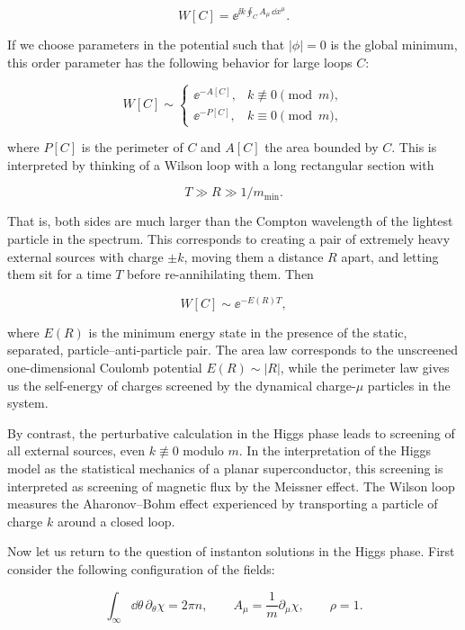 \[
  W[C]=\ee^{\ii k\oint_C A_\mu\,\dd x^\mu}.
\]

If we choose parameters in the potential such that $|\phi|=0$ is the global
minimum, this order parameter has the following behavior for large loops $C$:

\[
  W[C]\sim
  \begin{cases}
    \ee^{-A[C]},& k\not\equiv0\pmod m,\\
    \ee^{-P[C]},& k\equiv0\pmod m,
  \end{cases}
\]

where $P[C]$ is the perimeter of $C$ and $A[C]$ the area bounded by $C$. This
is interpreted by thinking of a Wilson loop with a long rectangular section with

\[
  T\gg R\gg1/m_{\min}.
\]

That is, both sides are much larger than the Compton wavelength of the lightest
particle in the spectrum. This corresponds to creating a pair of extremely heavy
external sources with charge $\pm k$, moving them a distance $R$ apart, and
letting them sit for a time $T$ before re-annihilating them. Then

\[
  W[C]\sim\ee^{-E(R)T},
\]

where $E(R)$ is the minimum energy state in the presence of the static,
separated, particle--anti-particle pair. The area law corresponds to the
unscreened one-dimensional Coulomb potential $E(R)\sim|R|$, while the perimeter
law gives us the self-energy of charges screened by the dynamical charge-$\mu$
particles in the system.

By contrast, the perturbative calculation in the Higgs phase leads to screening
of all external sources, even $k\not\equiv0$ modulo $m$. In the interpretation
of the Higgs model as the statistical mechanics of a planar superconductor, this
screening is interpreted as screening of magnetic flux by the Meissner effect.
The Wilson loop measures the Aharonov--Bohm effect experienced by transporting a
particle of charge $k$ around a closed loop.

Now let us return to the question of instanton solutions in the Higgs phase.
First consider the following configuration of the fields:

\[
  \int_{\infty}\dd\theta\,\partial_\theta\chi=2\pi n,
  \qquad A_\mu=\frac{1}{m}\partial_\mu\chi,
  \qquad \rho=1.
\]

